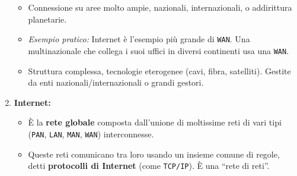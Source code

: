 \documentclass{article}
\begin{document}
\begin{enumerate}
    \begin{itemize}
        \item Connessione su aree molto ampie, nazionali, internazionali, o addirittura planetarie.
        \item \textit{Esempio pratico:} Internet è l'esempio più grande di \texttt{WAN}. Una multinazionale che collega i suoi uffici in diversi continenti usa una \texttt{WAN}.
        \item Struttura complessa, tecnologie eterogenee (cavi, fibra, satelliti). Gestite da enti nazionali/internazionali o grandi gestori.
    \end{itemize}
    \item \textbf{Internet:}
    \begin{itemize}
        \item È la \textbf{rete globale} composta dall'unione di moltissime reti di vari tipi (\texttt{PAN}, \texttt{LAN}, \texttt{MAN}, \texttt{WAN}) interconnesse.
        \item Queste reti comunicano tra loro usando un insieme comune di regole, detti \textbf{protocolli di Internet} (come \texttt{TCP/IP}). È una “rete di reti”.
    \end{itemize}
\end{enumerate}
\end{document}
